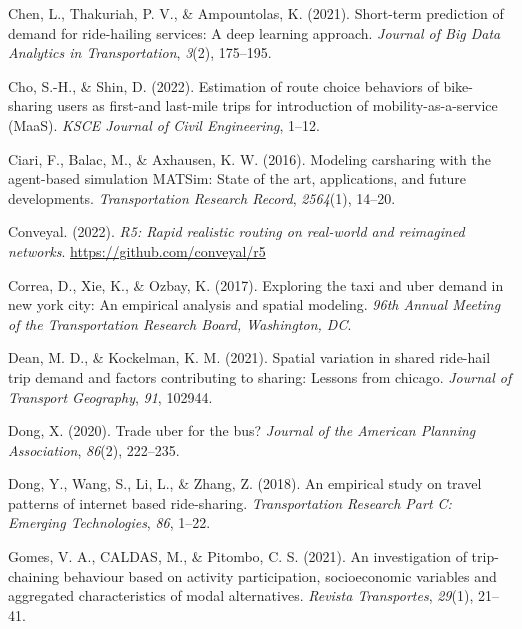\documentclass[fancy, masters]{byuthesis}
\newlength{\cslhangindent}
\newlength{\cslentryspacingunit} %
\newenvironment{CSLReferences}[2] %
 {%
  \setlength{\parindent}{0pt}
  \ifodd #1
  \let\oldpar\par
  \def\par{\hangindent=\cslhangindent\oldpar}
  \fi
  \setlength{\parskip}{#2\cslentryspacingunit}
 }%
 {}
\begin{document}
\begin{CSLReferences}{1}{0}
\leavevmode{}%
Chen, L., Thakuriah, P. V., \& Ampountolas, K. (2021). Short-term prediction of demand for ride-hailing services: A deep learning approach. \emph{Journal of Big Data Analytics in Transportation}, \emph{3}(2), 175--195.

\leavevmode{}%
Cho, S.-H., \& Shin, D. (2022). Estimation of route choice behaviors of bike-sharing users as first-and last-mile trips for introduction of mobility-as-a-service (MaaS). \emph{KSCE Journal of Civil Engineering}, 1--12.

\leavevmode{}%
Ciari, F., Balac, M., \& Axhausen, K. W. (2016). Modeling carsharing with the agent-based simulation MATSim: State of the art, applications, and future developments. \emph{Transportation Research Record}, \emph{2564}(1), 14--20.

\leavevmode{}%
Conveyal. (2022). \emph{R5: Rapid realistic routing on real-world and reimagined networks}. \url{https://github.com/conveyal/r5}

\leavevmode{}%
Correa, D., Xie, K., \& Ozbay, K. (2017). Exploring the taxi and uber demand in new york city: An empirical analysis and spatial modeling. \emph{96th Annual Meeting of the Transportation Research Board, Washington, DC}.

\leavevmode{}%
Dean, M. D., \& Kockelman, K. M. (2021). Spatial variation in shared ride-hail trip demand and factors contributing to sharing: Lessons from chicago. \emph{Journal of Transport Geography}, \emph{91}, 102944.

\leavevmode{}%
Dong, X. (2020). Trade uber for the bus? \emph{Journal of the American Planning Association}, \emph{86}(2), 222--235.

\leavevmode{}%
Dong, Y., Wang, S., Li, L., \& Zhang, Z. (2018). An empirical study on travel patterns of internet based ride-sharing. \emph{Transportation Research Part C: Emerging Technologies}, \emph{86}, 1--22.

\leavevmode{}%
Gomes, V. A., CALDAS, M., \& Pitombo, C. S. (2021). An investigation of trip-chaining behaviour based on activity participation, socioeconomic variables and aggregated characteristics of modal alternatives. \emph{Revista Transportes}, \emph{29}(1), 21--41.


\end{CSLReferences}
\end{document}
